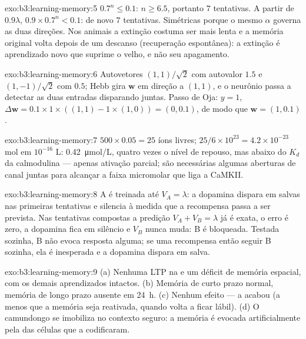 \begin{solution}{exo:b3:learning-memory:5}
$0.7^{n} \le 0.1$: $n \ge 6.5$, portanto $7$ tentativas. A partir de
$0.9\lambda$, $0.9\times 0.7^{n} < 0.1$: de novo $7$ tentativas.
Simétricas porque o mesmo $\alpha$ governa as duas direções. Nos animais
a extinção costuma ser mais lenta e a memória original volta depois de um
descanso (recuperação espontânea): a extinção é aprendizado novo que
suprime o velho, e não seu apagamento.
\end{solution}

\begin{solution}{exo:b3:learning-memory:6}
Autovetores $(1,1)/\sqrt{2}$ com autovalor $1.5$ e $(1,-1)/\sqrt{2}$ com
$0.5$; Hebb gira $\mathbf{w}$ em direção a $(1,1)$, e o neurônio passa a
detectar as duas entradas disparando juntas. Passo de Oja: $y = 1$,
$\Delta\mathbf{w} = 0.1\times 1\times((1,1) - 1\times(1,0)) = (0,0.1)$,
de modo que $\mathbf{w} = (1, 0.1)$.
\end{solution}

\begin{solution}{exo:b3:learning-memory:7}
$500\times 0.05 = 25$ íons livres; $25/6\times 10^{23} = 4.2\times 10^{-23}$ mol em $10^{-16}$ L: \qty{0.42}{\micro mol/L}, quatro vezes o
nível de repouso, mas abaixo do $K_{d}$ da calmodulina --- apenas
ativação parcial; são necessárias algumas aberturas de canal juntas para
alcançar a faixa micromolar que liga a CaMKII.
\end{solution}

\begin{solution}{exo:b3:learning-memory:8}
A é treinada até $V_{A} = \lambda$: a dopamina dispara em salvas nas
primeiras tentativas e silencia à medida que a recompensa passa a ser
prevista. Nas tentativas compostas a predição $V_{A} + V_{B} = \lambda$
já é exata, o erro é zero, a dopamina fica em silêncio e $V_{B}$ nunca
muda: B é bloqueada. Testada sozinha, B não evoca resposta alguma; se uma
recompensa então seguir B sozinha, ela é inesperada e a dopamina dispara
em salva.
\end{solution}

\begin{solution}{exo:b3:learning-memory:9}
(a) Nenhuma LTP na  e um déficit de memória espacial, com os demais
aprendizados intactos. (b) Memória de curto prazo normal, memória de
longo prazo ausente em \qty{24}{h}. (c) Nenhum efeito --- a 
acabou (a menos que a memória seja reativada, quando volta a ficar
lábil). (d) O camundongo se imobiliza no contexto seguro: a memória é
evocada artificialmente pela  das células que a codificaram.
\end{solution}

